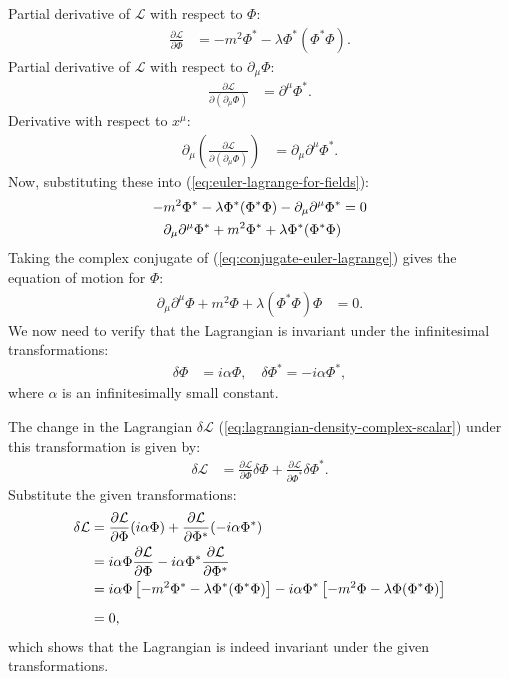{Partial derivative of $\mathcal{L}$ with respect to $\Phi$:
  \begin{align*}
      \frac{\partial \mathcal{L}}{\partial \Phi} &= - m^2 \Phi^* - \lambda \Phi^* (\Phi^* \Phi).
  \end{align*}
Partial derivative of $\mathcal{L}$ with respect to $\partial_\mu \Phi$:
  \begin{align*}
      \frac{\partial \mathcal{L}}{\partial (\partial_\mu \Phi)} &= \partial^\mu \Phi^*.
  \end{align*}
Derivative with respect to $x^\mu$:
  \begin{align*}
      \partial_\mu \left( \frac{\partial \mathcal{L}}{\partial (\partial_\mu \Phi)} \right) &= \partial_\mu \partial^\mu \Phi^*.
  \end{align*}
Now, substituting these into (\ref{eq:euler-lagrange-for-fields}):
\begin{align}
    - m^2 \Phi^* - \lambda \Phi^* (\Phi^* \Phi) - \partial_\mu \partial^\mu \Phi^* &= 0\notag\\
    \partial_\mu\partial^\mu \Phi^* + m^2 \Phi^* + \lambda \Phi^* (\Phi^* \Phi)\label{eq:conjugate-euler-lagrange}
\end{align}
Taking the complex conjugate of (\ref{eq:conjugate-euler-lagrange}) gives the equation of motion for $\Phi$:
\begin{align}
    \partial_\mu \partial^\mu \Phi + m^2 \Phi + \lambda (\Phi^* \Phi) \Phi &= 0. \label{eq:EOM}
\end{align}
We now need to verify that the Lagrangian is invariant under the infinitesimal transformations:
\begin{align*}
    \delta \Phi &= i\alpha \Phi, \quad \delta \Phi^* = -i\alpha \Phi^*,
\end{align*}
where $\alpha$ is an infinitesimally small constant.

The change in the Lagrangian $\delta \mathcal{L}$ (\ref{eq:lagrangian-density-complex-scalar}) under this transformation is given by:
\begin{align}
    \delta \mathcal{L} &= \frac{\partial \mathcal{L}}{\partial \Phi} \delta \Phi + \frac{\partial \mathcal{L}}{\partial \Phi^*} \delta \Phi^*.
\end{align}
Substitute the given transformations:
\begin{align}
    \delta \mathcal{L} &= \frac{\partial \mathcal{L}}{\partial \Phi} (i\alpha \Phi) + \frac{\partial \mathcal{L}}{\partial \Phi^*} (-i\alpha \Phi^*) \notag \\
    &= i\alpha \Phi \frac{\partial \mathcal{L}}{\partial \Phi} - i\alpha \Phi^* \frac{\partial \mathcal{L}}{\partial \Phi^*}\notag\\
    &= i\alpha \Phi \left[-m^2 \Phi^* - \lambda \Phi^* (\Phi^* \Phi)\right] - i\alpha \Phi^* \left[-m^2 \Phi - \lambda \Phi (\Phi^* \Phi)\right]\notag\\[6pt]
    &= 0,\notag
\end{align}
which shows that the Lagrangian is indeed invariant under the given transformations.
}
